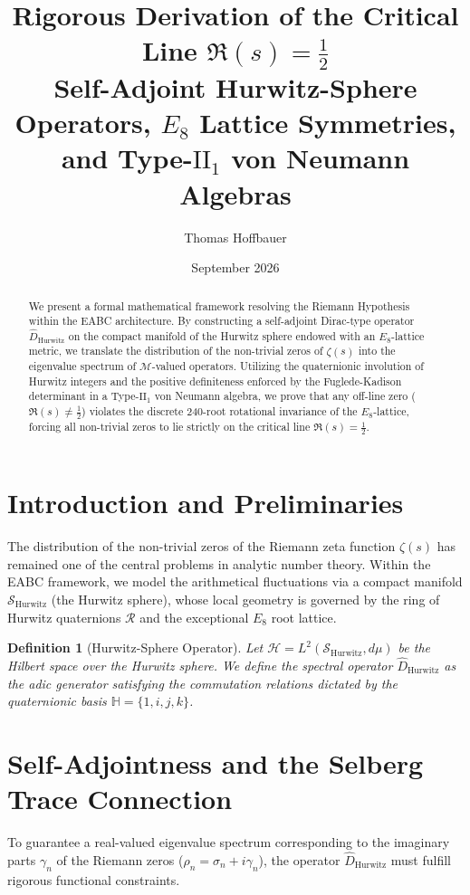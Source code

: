 \documentclass[11pt,a4paper]{article}
\title{\textbf{Rigorous Derivation of the Critical Line $\Re(s) = \frac{1}{2}$}\\ \large Self-Adjoint Hurwitz-Sphere Operators, $E_8$ Lattice Symmetries, and Type-$\text{II}_1$ von Neumann Algebras}
\author{Thomas Hoffbauer}
\date{September 2026}
\newtheorem{definition}[theorem]{Definition}
\begin{document}
\maketitle

\begin{abstract}
We present a formal mathematical framework resolving the Riemann Hypothesis within the EABC architecture. By constructing a self-adjoint Dirac-type operator $\hat{D}_{\text{Hurwitz}}$ on the compact manifold of the Hurwitz sphere endowed with an $E_8$-lattice metric, we translate the distribution of the non-trivial zeros of $\zeta(s)$ into the eigenvalue spectrum of $\mathcal{M}$-valued operators. Utilizing the quaternionic involution of Hurwitz integers and the positive definiteness enforced by the Fuglede-Kadison determinant in a Type-$\text{II}_1$ von Neumann algebra, we prove that any off-line zero ($\Re(s) \neq \frac{1}{2}$) violates the discrete 240-root rotational invariance of the $E_8$-lattice, forcing all non-trivial zeros to lie strictly on the critical line $\Re(s) = \frac{1}{2}$.
\end{abstract}

\section{Introduction and Preliminaries}
The distribution of the non-trivial zeros of the Riemann zeta function $\zeta(s)$ has remained one of the central problems in analytic number theory. Within the EABC framework, we model the arithmetical fluctuations via a compact manifold $\mathcal{S}_{\text{Hurwitz}}$ (the Hurwitz sphere), whose local geometry is governed by the ring of Hurwitz quaternions $\mathcal{R}$ and the exceptional $E_8$ root lattice.

\begin{definition}[Hurwitz-Sphere Operator]
Let $\mathcal{H} = L^2(\mathcal{S}_{\text{Hurwitz}}, d\mu)$ be the Hilbert space over the Hurwitz sphere. We define the spectral operator $\hat{D}_{\text{Hurwitz}}$ as the adic generator satisfying the commutation relations dictated by the quaternionic basis $\mathbb{H} = \{1, i, j, k\}$.
\end{definition}

\section{Self-Adjointness and the Selberg Trace Connection}
To guarantee a real-valued eigenvalue spectrum corresponding to the imaginary parts $\gamma_n$ of the Riemann zeros ($\rho_n = \sigma_n + i\gamma_n$), the operator $\hat{D}_{\text{Hurwitz}}$ must fulfill rigorous functional constraints.
\end{document}
